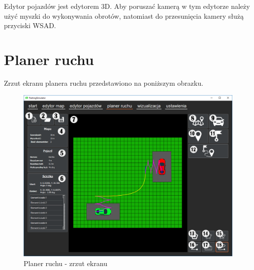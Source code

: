 \documentclass[a4paper,11pt,twoside]{report}
\theoremstyle{definition}
\begin{document}
Edytor pojazdów jest edytorem 3D. Aby poruszać kamerą w tym edytorze należy użyć myszki do wykonywania obrotów, natomiast do przesunięcia kamery służą przyciski WSAD.

\section{Planer ruchu}

Zrzut ekranu planera ruchu przedstawiono na poniższym obrazku.

\begin{figure}[h!]
\centering
\includegraphics[scale=0.5]{instructionPathPlanner}
\caption[Planer ruchu - zrzut ekranu]{Planer ruchu - zrzut ekranu}
\end{figure}
\end{document}
